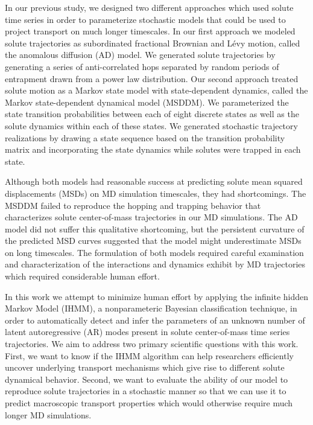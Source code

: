 \documentclass{article}
\begin{document}
  
  In our previous 
study,
  we designed two different approaches which used
  solute time series in order to parameterize stochastic models that could be used
  to project transport on much longer timescales. In our first approach we modeled 
  solute trajectories as subordinated fractional Brownian and L\'evy motion, called
  the anomalous diffusion (AD) model. We generated solute trajectories by generating
  a series of anti-correlated hops separated by random periods of entrapment drawn 
  from a power law distribution. Our second approach treated solute motion as a Markov
  state model with state-dependent dynamics, called the Markov state-dependent dynamical
  model (MSDDM). We parameterized the state transition probabilities between
  each of eight discrete states as well as the solute dynamics within each of these
  states. We generated stochastic trajectory realizations by drawing a state
  sequence based on the transition probability matrix and incorporating the state dynamics
  while solutes were trapped in each state.
  
  Although both models had reasonable success at predicting solute mean squared 
  displacements (MSDs) on MD simulation timescales, they had shortcomings.
  The MSDDM failed to reproduce the hopping and trapping behavior that
  characterizes solute center-of-mass trajectories in our MD simulations.
  The AD model did not suffer this qualitative shortcoming, but the persistent 
  curvature of the predicted MSD curves suggested that the model might 
  underestimate MSDs on long timescales. The formulation of both models required
  careful examination and characterization of the interactions and dynamics exhibit
  by MD trajectories which required considerable human effort.
  
  In this work we attempt to minimize human effort by applying the infinite hidden 
  Markov Model (IHMM), a nonparameteric Bayesian classification technique, in order to 
  automatically detect and infer the parameters of an unknown number of latent
  autoregressive (AR) modes present in solute center-of-mass time series trajectories.
  We aim to address two primary scientific questions with this work. First, we want
  to know if the IHMM algorithm can help researchers efficiently uncover underlying
  transport mechanisms which give rise to different solute dynamical behavior.
  Second, we want to evaluate the ability of our model to reproduce solute trajectories
  in a stochastic manner so that we can use it to predict macroscopic transport 
  properties which would otherwise require much longer MD simulations.
  
\end{document}
